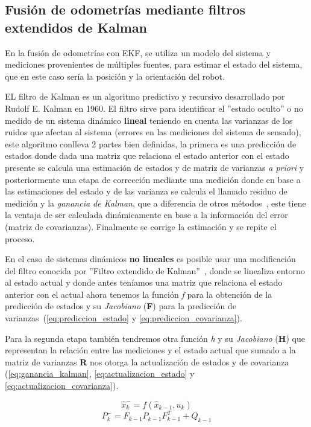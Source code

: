 \subsection{Fusión de odometrías mediante filtros extendidos de Kalman}

En la fusión de odometrías con EKF, se utiliza un modelo del sistema y mediciones provenientes de múltiples fuentes, para estimar el estado 
del sistema, que en este caso sería la posición y la orientación del robot.

EL filtro de Kalman es un algoritmo predictivo y recursivo desarrollado por Rudolf E. Kalman en 1960. El filtro sirve para identificar el ''estado oculto'' o no medido de un sistema dinámico \textbf{lineal} teniendo en cuenta las varianzas de 
los ruidos que afectan al sistema (errores en las mediciones del sistema de sensado), este algoritmo conlleva 2 partes 
bien definidas, la primera es una predicción de estados donde dada una matriz que relaciona el estado anterior con el estado presente 
se calcula una estimación de estados y de matriz de varianzas \textit{a priori} y posteriormente una etapa de corrección mediante una 
medición donde en base a las estimaciones del estado y de las varianza se calcula el llamado residuo de medición y la \textit{ganancia de Kalman}, 
que a diferencia de otros métodos~\cite{wikiLuenberg}, este tiene la ventaja de ser calculada dinámicamente en base a la información del error (matriz de covarianzas). 
Finalmente se corrige la estimación y se repite el proceso.

En el caso de sistemas dinámicos \textbf{no lineales} es posible usar una modificación del filtro conocida por ''Filtro extendido de Kalman''~\cite{rigatos2007extended}, donde 
se linealiza entorno al estado actual y donde antes teníamos una matriz que relaciona el estado anterior con el actual ahora tenemos la función \textit{f} 
para la obtención de la predicción de estados y su \textit{Jacobiano} (\textbf{F}) para la predicción de varianzas~(\ref{eq:prediccion_estado} y \ref{eq:prediccion_covarianza}).

Para la segunda etapa también tendremos otra función \textit{h} y su \textit{Jacobiano} (\textbf{H}) que representan la relación entre 
las mediciones y el estado actual que sumado a la matriz de varianzas \textbf{R} nos otorga la actualización de estados y de covarianza (\ref{eq:ganancia_kalman}, \ref{eq:actualizacion_estado} y \ref{eq:actualizacion_covarianza}). 

\begin{equation}\label{eq:prediccion_estado}
\hat{x}_k^- = f(\hat{x}_{k-1}, u_k) 
\end{equation}
\begin{equation}\label{eq:prediccion_covarianza}
P_k^- = F_{k-1}P_{k-1}F_{k-1}^T + Q_{k-1}
\end{equation}

